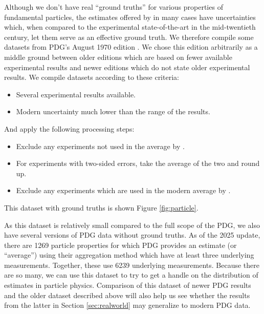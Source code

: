 \documentclass[12pt]{article}
\begin{document}
Although we don't have real ``ground truths'' for various properties of fundamental particles, the estimates offered by \citet{navas2024review} in many cases have uncertainties which, when compared to the experimental state-of-the-art in the mid-twentieth century, let them serve as an effective ground truth. We therefore compile some datasets from PDG's August 1970 edition \citet{roos1970review}. We chose this edition arbitrarily as a middle ground between older editions which are based on fewer available experimental results and newer editions which do not state older experimental results. We compile datasets according to these criteria:
\begin{itemize}
  \item Several experimental results available.
  \item Modern uncertainty much lower than the range of the results.
\end{itemize}
And apply the following processing steps:
\begin{itemize}
  \item Exclude any experiments not used in the average by \citet{roos1970review}.
  \item For experiments with two-sided errors, take the average of the two and round up.
  \item Exclude any experiments which are used in the modern average by \citet{navas2024review}.
\end{itemize}
This dataset with ground truths is shown Figure \ref{fig:particle}.

As this dataset is relatively small compared to the full scope of the PDG, we also have several versions of PDG data without ground truths. As of the 2025 update, there are 1269 particle properties for which PDG provides an estimate (or ``average'') using their aggregation method which have at least three underlying measurements. Together, these use 6239 underlying measurements. Because there are so many, we can use this dataset to try to get a handle on the distribution of estimates in particle physics. Comparison of this dataset of newer PDG results and the older dataset described above will also help us see whether the results from the latter in Section \ref{sec:realworld} may generalize to modern PDG data.
\end{document}
